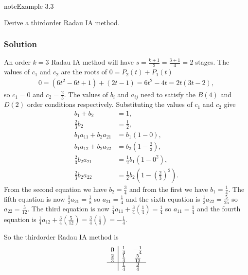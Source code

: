 \documentclass[letterpaper,10pt,english]{jupyterBook}
\begin{document}
\begin{sphinxadmonition}{note}{Example 3.3}

\sphinxAtStartPar
Derive a third\sphinxhyphen{}order Radau IA method.
\subsubsection*{Solution}

\sphinxAtStartPar
An order \(k=3\) Radau IA method will have \(s=\frac{k + 1}{2} = \frac{3 + 1}{4} = 2\) stages. The values of \(c_1\) and \(c_2\) are the roots of \(0=P_2(t)+P_1(t)\)
\begin{align*}
    0 = (6t^2 -6t+1)+(2t-1) = 6t^2 -4t = 2t(3t - 2),
\end{align*}
\sphinxAtStartPar
so \(c_1 = 0\) and \(c_2 = \frac{2}{3}\). The values of \(b_i\) and \(a_{ij}\) need to satisfy the \(B(4)\) and \(D(2)\) order conditions respectively. Substituting the values of \(c_1\) and \(c_2\) give
\begin{align*}
    b_1 + b_2 &= 1, \\
    \tfrac{2}{3}b_2 &= \tfrac{1}{2}, \\
    b_1 a_{11} + b_2 a_{21} &= b_1 (1 - 0), \\
    b_1 a_{12} + b_2 a_{22} &= b_2 (1 - \tfrac{2}{3}), \\
    \tfrac{2}{3} b_2 a_{21} &= \tfrac{1}{2} b_1 (1 - 0^2), \\
    \tfrac{2}{3} b_2 a_{22} &= \tfrac{1}{2} b_2 (1 - (\tfrac{2}{3})^2).
\end{align*}
\sphinxAtStartPar
From the second equation we have \(b_2 = \frac{3}{4}\) and from the first we have \(b_1 = \frac{1}{4}\). The fifth equation is now \(\frac{1}{2} a_{21} = \frac{1}{8}\) so \(a_{21} = \frac{1}{4}\) and the sixth equation is \(\frac{1}{2} a_{22} = \frac{5}{25}\) so \(a_{22} = \frac{5}{12}\). The third equation is now \(\frac{1}{4} a_{11} + \frac{3}{4} (\frac{1}{4}) = \frac{1}{4}\) so \(a_{11} = \frac{1}{4}\) and the fourth equation is \(\frac{1}{4} a_{12} + \frac{3}{4}(\frac{5}{12}) = \frac{3}{4} (\frac{1}{3}) = -\frac{1}{4}\).

\sphinxAtStartPar
So the third\sphinxhyphen{}order Radau IA method is
\begin{align*}
    \begin{array}{c|cc}
        0 & \tfrac{1}{4} & -\tfrac{1}{4} \\
        \tfrac{2}{3} & \tfrac{1}{4} & \frac{5}{12} \\ \hline
        & \tfrac{1}{4} & \tfrac{3}{4}
    \end{array}
\end{align*}\end{sphinxadmonition}
\end{document}
